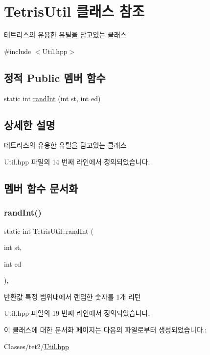 \hypertarget{class_tetris_util}{}\section{Tetris\+Util 클래스 참조}
\label{class_tetris_util}


테트리스의 유용한 유틸을 담고있는 클래스  




{\ttfamily \#include $<$Util.\+hpp$>$}

\subsection*{정적 Public 멤버 함수}
\begin{DoxyCompactItemize}
\item 
static int \hyperlink{class_tetris_util_a0a60e809425ddb416a500bcc03cf7061}{rand\+Int} (int st, int ed)
\end{DoxyCompactItemize}


\subsection{상세한 설명}
테트리스의 유용한 유틸을 담고있는 클래스 

Util.\+hpp 파일의 14 번째 라인에서 정의되었습니다.



\subsection{멤버 함수 문서화}
\mbox{\label{class_tetris_util_a0a60e809425ddb416a500bcc03cf7061}} 
\subsubsection{\texorpdfstring{rand\+Int()}{randInt()}}
{\footnotesize\ttfamily static int Tetris\+Util\+::rand\+Int (\begin{DoxyParamCaption}\item[{int}]{st,  }\item[{int}]{ed }\end{DoxyParamCaption})\hspace{0.3cm}{\ttfamily [inline]}, {\ttfamily [static]}}

\begin{DoxyReturn}{반환값}
특정 범위내에서 랜덤한 숫자를 1개 리턴 
\end{DoxyReturn}


Util.\+hpp 파일의 19 번째 라인에서 정의되었습니다.



이 클래스에 대한 문서화 페이지는 다음의 파일로부터 생성되었습니다.\+:\begin{DoxyCompactItemize}
\item 
Classes/tet2/\hyperlink{_util_8hpp}{Util.\+hpp}\end{DoxyCompactItemize}
